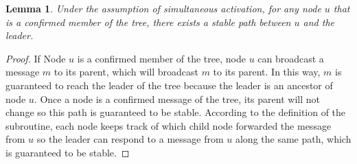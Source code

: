 \documentclass[english]{article}
\newtheorem{lemma}[theorem]{Lemma}
\begin{document}
\begin{lemma}
\label{StaticStablePath}
Under the assumption of simultaneous activation, for any node $u$ that is a confirmed member of the tree, there exists a stable path between $u$ and the leader.
\end{lemma}
\begin{proof}

If Node $u$ is a confirmed member of the tree, node $u$ can broadcast a message $m$ to its parent, which will broadcast $m$ to its parent. In this way, $m$ is guaranteed to reach the leader of the tree because the leader is an ancestor of node $u$. Once a node is a confirmed message of the tree, its parent will not change so this path is guaranteed to be stable. According to the definition of the subroutine, each node keeps track of which child node forwarded the message from $u$ so the leader can respond to a message from $u$ along the same path, which is guaranteed to be stable. 

\end{proof}
\end{document}
